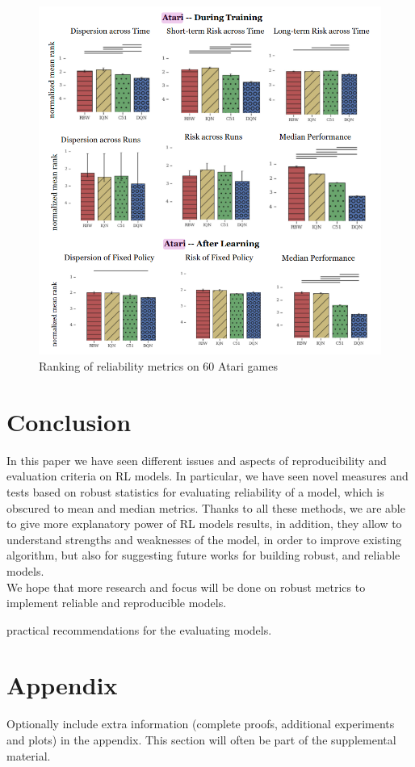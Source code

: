 \documentclass{article}
\begin{document}
\begin{figure}[!htp]
	\centering
	\includegraphics[scale=0.3]{./images/atari_ranking.png}
	\caption{Ranking of reliability metrics on 60 Atari games~\cite{GoogleMeasure}}
	\label{fig:realibility}
	\footnotesize{}
\end{figure}


\section{Conclusion}
In this paper we have seen different issues and aspects of reproducibility and evaluation criteria on RL models. In particular, we have seen novel measures and tests based on robust statistics  for evaluating reliability of a model, which is obscured to mean and median metrics. Thanks to all these methods, we are able to give more explanatory power of RL models results, in addition, they allow to understand strengths and weaknesses of the model, in order to improve existing algorithm, but also for suggesting future works for building robust, and reliable models.\\
We hope that more research and focus will be done on robust metrics to implement reliable and reproducible models.

practical recommendations for the evaluating models.
\clearpage


\section{Appendix}

Optionally include extra information (complete proofs, additional experiments and plots) in the appendix.
This section will often be part of the supplemental material.

{\small
	
	
}

\appendix
\end{document}
